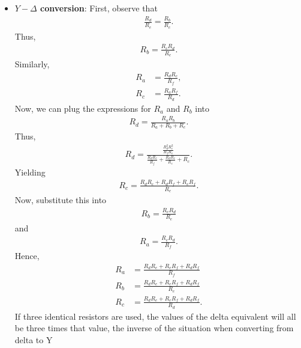 \documentclass{report}
\begin{document}
\begin{itemize}
\begin{align*}
            .\end{align*}
            After simplifying,
            \begin{align*}
                R_{d} = \frac{R_{a}R_{b}}{R_{a} + R_{b} + R_{c}}
            .\end{align*}
            Similarly, 
            \begin{align*}
                R_{e} &= \frac{R_{a}R_{c}}{R_{a} + R_{b} + R_{c}}, \\
                R_{f} &= \frac{R_{b}R_{c}}{R_{a} + R_{b} + R_{c}}
            .\end{align*}
        \item \textbf{$Y-\Delta$ conversion}: First, observe that
            \begin{align*}
                \frac{R_{d}}{R_{e}} = \frac{R_{b}}{R_{c}}
            .\end{align*}
            Thus,
            \begin{align*}
                R_{b} = \frac{R_{c}R_{d}}{R_{e}}
            .\end{align*}
            Similarly, 
            \begin{align*}
                R_{a} &= \frac{R_{d}R_{c}}{R_{f}}, \\
                R_{c} &= \frac{R_{a}R_{f}}{R_{d}}
            .\end{align*}
            Now, we can plug the expressions for $R_{a}$ and $R_{b}$ into 
            \begin{align*}
                R_{d} = \frac{R_{a}R_{b}}{R_{a} + R_{b} + R_{c}}
            .\end{align*}
            Thus,
            \begin{align*}
                R_{d} = \frac{\frac{R_{d}^{2}R_{c}^{2}}{R_{f}R_{e}}}{\frac{R_{d}R_{c}}{R_{f}} + \frac{R_{d}R_{c}}{R_{e}} + R_{c}}
            .\end{align*}
            Yielding
            \begin{align*}
                R_{c} = \frac{R_{d}R_{e} + R_{d}R_{f} + R_{e}R_{f}}{R_{e}}
            .\end{align*}
            Now, substitute this into
            \begin{align*}
                R_{b} = \frac{R_{c}R_{d}}{R_{e}}
            \end{align*}
            and
            \begin{align*}
                R_{a} = \frac{R_{c}R_{d}}{R_{f}}
            .\end{align*}
            Hence,
            \begin{align*}
                R_{a} &= \frac{R_{d}R_{e} + R_{e}R_{f} + R_{d}R_{f}}{R_{f}} \\
                R_{b} &= \frac{R_{d}R_{e} + R_{e}R_{f} + R_{d}R_{f}}{R_{e}} \\
                R_{c} &= \frac{R_{d}R_{e} + R_{e}R_{f} + R_{d}R_{f}}{R_{d}}
            .\end{align*}
            If three identical resistors are used, the values of the delta equivalent will all be three times that value, the inverse of the situation when converting from delta to Y



\end{itemize}
\end{document}
